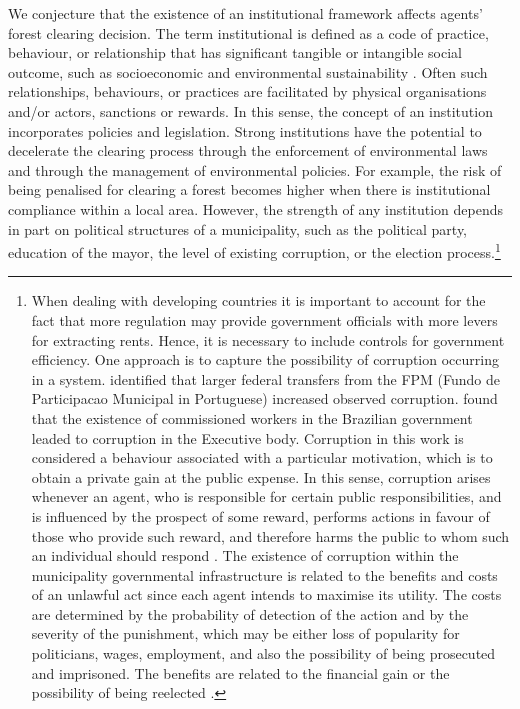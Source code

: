 We conjecture that the existence of an institutional framework affects agents' forest clearing decision. The term institutional is defined as a code of practice, behaviour, or relationship that has significant tangible or intangible social outcome, such as socioeconomic and environmental sustainability \citep{NORTH}. Often such relationships, behaviours, or practices are facilitated by physical organisations and/or actors, sanctions or rewards. In this sense, the concept of an institution incorporates policies and legislation. Strong institutions have the potential to decelerate the clearing process through the enforcement of environmental laws and through the management of environmental policies. For example, the risk of being penalised for clearing a forest becomes higher when there is institutional compliance within a local area. However, the strength of any institution depends in part on political structures of a municipality, such as the political party, education of the mayor, the level of existing corruption, or the election process.\footnote{When dealing with developing countries it is important to account for the fact that more regulation may provide government officials with more levers for extracting rents. Hence, it is necessary to include controls for government efficiency. One approach is to capture the possibility of corruption occurring in a system. \citet{BROLLO_2013} identified that larger federal transfers from the FPM (Fundo de Participacao Municipal in Portuguese) increased observed corruption. \citet{BUGARIN} found that the existence of commissioned workers in the Brazilian government leaded to corruption in the Executive body. Corruption in this work is considered a behaviour associated with a particular motivation, which is to obtain a private gain at the public expense. In this sense, corruption arises whenever an agent, who is responsible for certain public responsibilities, and is influenced by the prospect of some reward, performs actions in favour of those who provide such reward, and therefore harms the public to whom such an individual should respond \citep{CARL2002}. The existence of corruption within the municipality governmental infrastructure is related to the benefits and costs of an unlawful act since each agent intends to maximise its utility. The costs are determined by the probability of detection of the action and by the severity of the punishment, which may be either loss of popularity for politicians, wages, employment, and also the possibility of being prosecuted and imprisoned. The benefits are related to the financial gain \citep{GARCIA, ALBUQUERQUE, BUGARIN} or the possibility of being reelected \citep{BROLLO_2013}.} 

